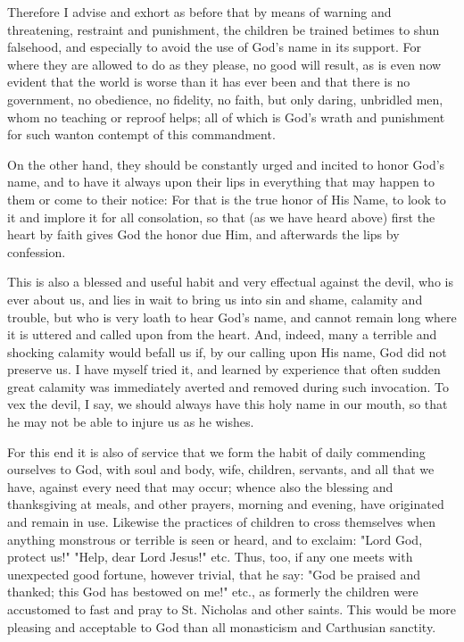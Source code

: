 Therefore I advise and exhort as before that by means of warning and
threatening, restraint and punishment, the children be trained betimes
to shun falsehood, and especially to avoid the use of God's name in its
support. For where they are allowed to do as they please, no good will
result, as is even now evident that the world is worse than it has ever
been and that there is no government, no obedience, no fidelity, no
faith, but only daring, unbridled men, whom no teaching or reproof
helps; all of which is God's wrath and punishment for such wanton
contempt of this commandment.

On the other hand, they should be constantly urged and incited to
honor God's name, and to have it always upon their lips in everything
that may happen to them or come to their notice: For that is the true
honor of His Name, to look to it and implore it for all consolation, so
that (as we have heard above) first the heart by faith gives God the
honor due Him, and afterwards the lips by confession.

This is also a blessed and useful habit and very effectual against the
devil, who is ever about us, and lies in wait to bring us into sin and
shame, calamity and trouble, but who is very loath to hear God's name,
and cannot remain long where it is uttered and called upon from the
heart. And, indeed, many a terrible and shocking calamity would befall
us if, by our calling upon His name, God did not preserve us. I have
myself tried it, and learned by experience that often sudden great
calamity was immediately averted and removed during such invocation. To
vex the devil, I say, we should always have this holy name in our
mouth, so that he may not be able to injure us as he wishes.

For this end it is also of service that we form the habit of daily
commending ourselves to God, with soul and body, wife, children,
servants, and all that we have, against every need that may occur;
whence also the blessing and thanksgiving at meals, and other prayers,
morning and evening, have originated and remain in use. Likewise the
practices of children to cross themselves when anything monstrous or
terrible is seen or heard, and to exclaim: "Lord God, protect us!"
"Help, dear Lord Jesus!" etc. Thus, too, if any one meets with
unexpected good fortune, however trivial, that he say: "God be praised
and thanked; this God has bestowed on me!" etc., as formerly the
children were accustomed to fast and pray to St. Nicholas and other
saints. This would be more pleasing and acceptable to God than all
monasticism and Carthusian sanctity.

